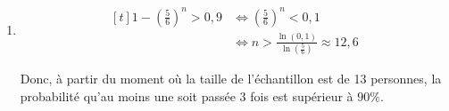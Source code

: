 \documentclass{scrartcl}
\begin{document}
\begin{adjustwidth}{2em}{0pt}
\begin{enumerate}
\begin{enumerate}[label=\alph*)]
                        \item   \[\begin{aligned}[t]
                                    1-\left(\frac{5}{6}\right)^n>0{,}9&\iff\left(\frac{5}{6}\right)^n<0{,}1 \\
                                    &\iff n>\frac{\ln\left(0{,}1\right)}{\ln\left(\tfrac{5}{6}\right)}\approx 12{,}6
                                \end{aligned}\]
                                 \par
                                Donc, à partir du moment où la taille de l'échantillon est de 13 personnes, la probabilité qu'au moins une soit passée 3 fois est supérieur à $90\%$.
                    \end{enumerate}
        \end{enumerate}
    \end{adjustwidth}
\end{document}

